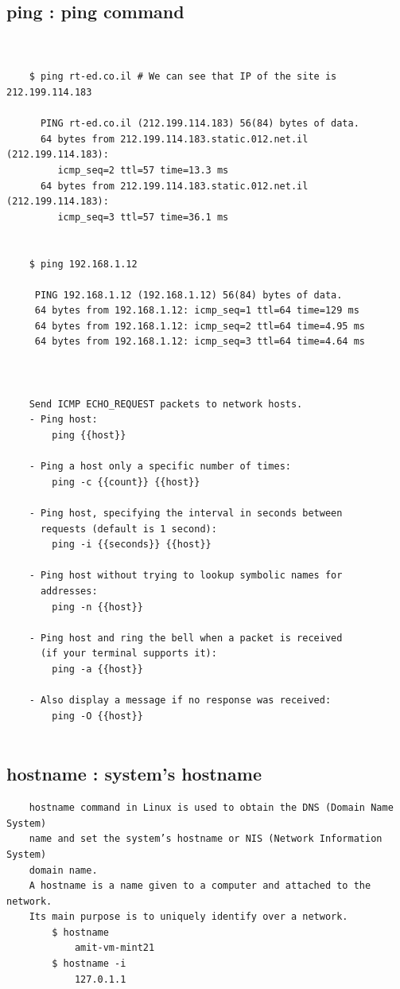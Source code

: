 \documentclass[a4paper,12pt]{article}
\begin{document}
\subsection{ping   : ping command}
\begin{verbatim}
    
    
    $ ping rt-ed.co.il # We can see that IP of the site is 212.199.114.183
      
      PING rt-ed.co.il (212.199.114.183) 56(84) bytes of data.
      64 bytes from 212.199.114.183.static.012.net.il (212.199.114.183):   
         icmp_seq=2 ttl=57 time=13.3 ms
      64 bytes from 212.199.114.183.static.012.net.il (212.199.114.183): 
         icmp_seq=3 ttl=57 time=36.1 ms


    $ ping 192.168.1.12
     
     PING 192.168.1.12 (192.168.1.12) 56(84) bytes of data.
     64 bytes from 192.168.1.12: icmp_seq=1 ttl=64 time=129 ms
     64 bytes from 192.168.1.12: icmp_seq=2 ttl=64 time=4.95 ms
     64 bytes from 192.168.1.12: icmp_seq=3 ttl=64 time=4.64 ms

    
    
    Send ICMP ECHO_REQUEST packets to network hosts.
    - Ping host:
        ping {{host}}

    - Ping a host only a specific number of times:
        ping -c {{count}} {{host}}

    - Ping host, specifying the interval in seconds between
      requests (default is 1 second):
        ping -i {{seconds}} {{host}}

    - Ping host without trying to lookup symbolic names for
      addresses:
        ping -n {{host}}

    - Ping host and ring the bell when a packet is received
      (if your terminal supports it):
        ping -a {{host}}

    - Also display a message if no response was received:
        ping -O {{host}}
    
\end{verbatim}

\subsection{hostname : system’s hostname}
\begin{verbatim}
    hostname command in Linux is used to obtain the DNS (Domain Name System)
    name and set the system’s hostname or NIS (Network Information System) 
    domain name.
    A hostname is a name given to a computer and attached to the network.
    Its main purpose is to uniquely identify over a network.
        $ hostname
            amit-vm-mint21
        ﻿$ hostname -i
            127.0.1.1
\end{verbatim}
\end{document}

